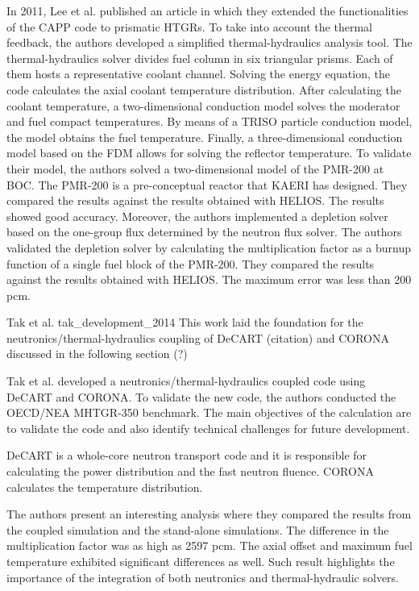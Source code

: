 \documentclass[11pt,letterpaper]{article}
\begin{document}
In 2011, Lee et al. published an article \cite{lee_development_2011} in which they extended the functionalities of the CAPP code to prismatic \glspl{HTGR}.
To take into account the thermal feedback, the authors developed a simplified thermal-hydraulics analysis tool.
The thermal-hydraulics solver divides fuel column in six triangular prisms.
Each of them hosts a representative coolant channel.
Solving the energy equation, the code calculates the axial coolant temperature distribution.
After calculating the coolant temperature, a two-dimensional conduction model solves the moderator and fuel compact temperatures.
By means of a TRISO particle conduction model, the model obtains the fuel temperature.
Finally, a three-dimensional conduction model based on the \gls{FDM} allows for solving the reflector temperature.
To validate their model, the authors solved a two-dimensional model of the PMR-200 at \gls{BOC}.
The PMR-200 is a pre-conceptual reactor that \gls{KAERI} has designed.
They compared the results against the results obtained with HELIOS.
The results showed good accuracy.
Moreover, the authors implemented a depletion solver based on the one-group flux determined by the neutron flux solver.
The authors validated the depletion solver by calculating the multiplication factor as a burnup function of a single fuel block of the PMR-200.
They compared the results against the results obtained with HELIOS.
The maximum error was less than 200 pcm.

Tak et al. tak_development_2014
This work laid the foundation for the neutronics/thermal-hydraulics coupling of DeCART (citation) and CORONA discussed in the following section (?)

Tak et al. \cite{tak_coupled_2016} developed a neutronics/thermal-hydraulics coupled code using DeCART \cite{kaeri_decart_2007} and CORONA.
To validate the new code, the authors conducted the OECD/NEA MHTGR-350 benchmark.
The main objectives of the calculation are to validate the code and also identify technical challenges for future development.

DeCART is a whole-core neutron transport code and it is responsible for calculating the power distribution and the fast neutron fluence.
CORONA calculates the temperature distribution.

The authors present an interesting analysis where they compared the results from the coupled simulation and the stand-alone simulations.
The difference in the multiplication factor was as high as 2597 pcm.
The axial offset and maximum fuel temperature exhibited significant differences as well.
Such result highlights the importance of the integration of both neutronics and thermal-hydraulic solvers.
\end{document}
